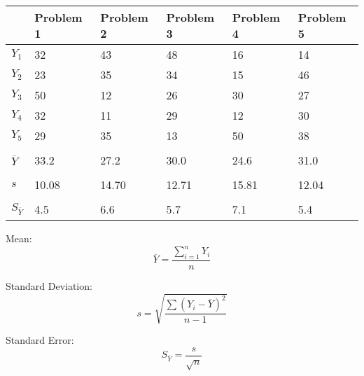 \documentclass[12pt]{exam}
\begin{document}
\begin{tabular}[l]{@{}R{0.5in}R{0.75in}R{0.75in}R{0.75in}R{0.75in}R{0.75in}@{}}	
	\toprule
	& Problem 1	& Problem 2	& Problem 3	& Problem 4	& Problem 5\\
	\midrule
	$Y_1$	& 32	& 43	& 48	& 16	& 14\\
	$Y_2$	& 23	& 35	& 34	& 15	& 46\\
	$Y_3$	& 50	& 12	& 26	& 30	& 27\\
	$Y_4$	& 32	& 11	& 29	& 12	& 30\\
	$Y_5$	& 29	& 35	& 13	& 50	& 38\\
	& 	& 	& 	& \\
	$\overline{Y}$	& 33.2	& 27.2	& 30.0	& 24.6	& 31.0\\
	&	&	&	& \\
	$s$	& 10.08	& 14.70	& 12.71	& 15.81	& 12.04\\
	&	&	&	& \\
	$S_{\overline{Y}}$	& 4.5	& 6.6	& 5.7	& 7.1	& 5.4\\
	\bottomrule
\end{tabular}

	\bigskip
	
	\bigskip
	
	Mean:
	\begin{equation*}
	\overline{Y} = \dfrac{\sum\limits^n_{i=1} Y_i}{n}
	\end{equation*}
	
	\bigskip
	
	Standard Deviation:
	\begin{equation*}
	 s = \sqrt{\dfrac{\sum\left(Y_i - \overline{Y}\right)^2}{n-1}}
	\end{equation*}

	\bigskip

	Standard Error:
	\begin{equation*}
	S_{\overline{Y}} = \dfrac{s}{\sqrt{n}}
	\end{equation*}
\end{document}
